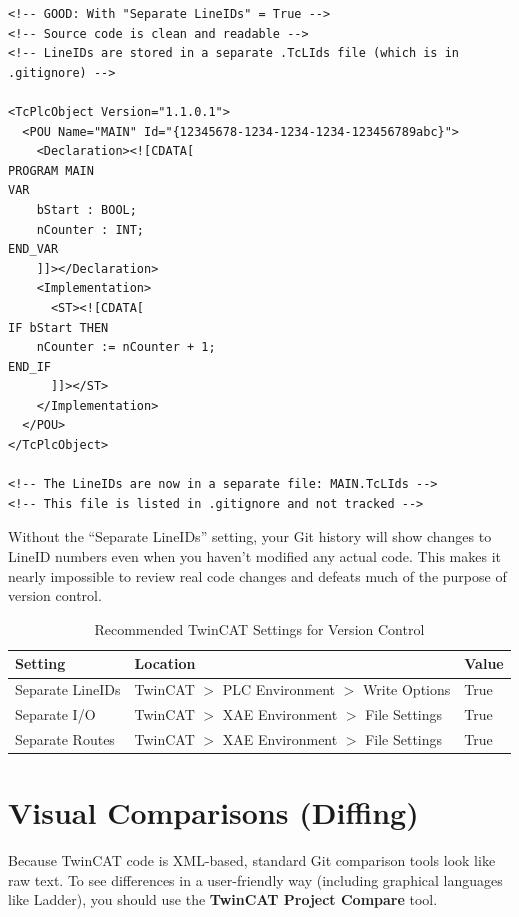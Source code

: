 \documentclass[11pt,a4paper]{article}
\begin{document}
\begin{lstlisting}[style=xmlstyle]
<!-- GOOD: With "Separate LineIDs" = True -->
<!-- Source code is clean and readable -->
<!-- LineIDs are stored in a separate .TcLIds file (which is in .gitignore) -->

<TcPlcObject Version="1.1.0.1">
  <POU Name="MAIN" Id="{12345678-1234-1234-1234-123456789abc}">
    <Declaration><![CDATA[
PROGRAM MAIN
VAR
    bStart : BOOL;
    nCounter : INT;
END_VAR
    ]]></Declaration>
    <Implementation>
      <ST><![CDATA[
IF bStart THEN
    nCounter := nCounter + 1;
END_IF
      ]]></ST>
    </Implementation>
  </POU>
</TcPlcObject>

<!-- The LineIDs are now in a separate file: MAIN.TcLIds -->
<!-- This file is listed in .gitignore and not tracked -->
\end{lstlisting}

\begin{warningbox}
Without the ``Separate LineIDs'' setting, your Git history will show changes to LineID numbers even when you haven't modified any actual code. This makes it nearly impossible to review real code changes and defeats much of the purpose of version control.
\end{warningbox}

\begin{table}[h]
\centering
\begin{tabular}{@{}lll@{}}
\toprule
\textbf{Setting} & \textbf{Location} & \textbf{Value} \\
\midrule
Separate LineIDs & TwinCAT $>$ PLC Environment $>$ Write Options & True \\
Separate I/O & TwinCAT $>$ XAE Environment $>$ File Settings & True \\
Separate Routes & TwinCAT $>$ XAE Environment $>$ File Settings & True \\
\bottomrule
\end{tabular}
\caption{Recommended TwinCAT Settings for Version Control}
\end{table}

\section{Visual Comparisons (Diffing)}

Because TwinCAT code is XML-based, standard Git comparison tools look like raw text. To see differences in a user-friendly way (including graphical languages like Ladder), you should use the \textbf{TwinCAT Project Compare} tool.
\end{document}
